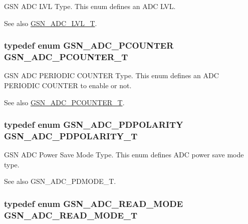 GSN ADC LVL Type. This enum defines an ADC LVL. 

\begin{DoxySeeAlso}{See also}
\hyperlink{a00643_ga5a94fb4298f40809bab65da9dd446da7}{GSN\_\-ADC\_\-LVL\_\-T}. 
\end{DoxySeeAlso}
\hypertarget{a00643_ga61aa307a5df8fedd147de04bbdb9a36d}{
\subsubsection[{GSN\_\-ADC\_\-PCOUNTER\_\-T}]{\setlength{\rightskip}{0pt plus 5cm}typedef enum {\bf GSN\_\-ADC\_\-PCOUNTER}  {\bf GSN\_\-ADC\_\-PCOUNTER\_\-T}}}
\label{a00643_ga61aa307a5df8fedd147de04bbdb9a36d}


GSN ADC PERIODIC COUNTER Type. This enum defines an ADC PERIODIC COUNTER to enable or not. 

\begin{DoxySeeAlso}{See also}
\hyperlink{a00643_ga61aa307a5df8fedd147de04bbdb9a36d}{GSN\_\-ADC\_\-PCOUNTER\_\-T}. 
\end{DoxySeeAlso}
\hypertarget{a00643_gadc237f56f621b5000b7ed2b2617ff364}{
\subsubsection[{GSN\_\-ADC\_\-PDPOLARITY\_\-T}]{\setlength{\rightskip}{0pt plus 5cm}typedef enum {\bf GSN\_\-ADC\_\-PDPOLARITY}  {\bf GSN\_\-ADC\_\-PDPOLARITY\_\-T}}}
\label{a00643_gadc237f56f621b5000b7ed2b2617ff364}


GSN ADC Power Save Mode Type. This enum defines ADC power save mode type. 

\begin{DoxySeeAlso}{See also}
GSN\_\-ADC\_\-PDMODE\_\-T. 
\end{DoxySeeAlso}
\hypertarget{a00643_ga67df3ab0d6b619d585d941ad1f3f0233}{
\subsubsection[{GSN\_\-ADC\_\-READ\_\-MODE\_\-T}]{\setlength{\rightskip}{0pt plus 5cm}typedef enum {\bf GSN\_\-ADC\_\-READ\_\-MODE}  {\bf GSN\_\-ADC\_\-READ\_\-MODE\_\-T}}}
\label{a00643_ga67df3ab0d6b619d585d941ad1f3f0233}


